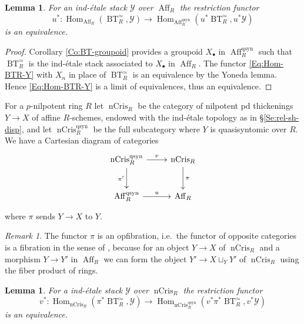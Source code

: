 \documentclass[a4paper,11pt]{amsart}
\theoremstyle{plain}
\newtheorem{Lemma}[equation]{Lemma}
\theoremstyle{definition}
\theoremstyle{remark}
\newtheorem{Remark}[equation]{Remark}
\newcommand{\bLe}{\begin{Lemma}}
\newcommand{\eLe}{\end{Lemma}}
\newcommand{\bRe}{\begin{Remark}}
\newcommand{\eRe}{\end{Remark}}
\newcommand{\bproof}{\begin{proof}}
\newcommand{\eproof}{\end{proof}}
\newcommand{\beqn}{\begin{equation}}
\newcommand{\eeqn}{\end{equation}}
\numberwithin{equation}{section}
\newcommand{\YYY}{\mathcal{Y}}
\DeclareMathOperator{\qsyn}{qsyn}
\DeclareMathOperator{\Aff}{Aff}
\DeclareMathOperator{\nCrys}{nCris}
\DeclareMathOperator{\BT}{BT}
\DeclareMathOperator{\Hom}{Hom}
\begin{document}
\bLe
\label{Le:Hom-BTR-Y}
For an ind-\'etale stack $\YYY$ over $\Aff_R$ the restriction functor 
\beqn
\label{Eq:Hom-BTR-Y}
u^*\colon \Hom_{\Aff_R}(\BT^\simeq_R,\YYY)\to\Hom_{\Aff_R^{\qsyn}}(u^*\BT^\simeq_R,u^*\YYY)
\eeqn
is an equivalence. 
\eLe

\bproof
Corollary \ref{Co:BT-groupoid} provides a groupoid $X_\bullet$ in $\Aff_R^{\qsyn}$ such that $\BT^\simeq_R$ is the ind-\'etale stack associated to $X_\bullet$ in $\Aff_R$. The functor \eqref{Eq:Hom-BTR-Y} with $X_n$ in place of $\BT^\simeq_R$ is an equivalence by the Yoneda lemma. Hence \eqref{Eq:Hom-BTR-Y} is a limit of equivalences, thus an equivalence.
\eproof

For a $p$-nilpotent ring $R$ let $\nCrys_R$ be the category of nilpotent pd thickenings $Y\to X$ of affine $R$-schemes, endowed with the ind-\'etale topology as in \S\ref{Se:rel-sh-disp}, and let $\nCrys_R^{\qsyn}$ be the full subcategory where $Y$ is quasisyntomic over $R$. We have a Cartesian diagram of categories
\[
\xymatrix@M+0.2em{
\nCrys_R^{\qsyn} \ar[r]^-v \ar[d]_{\pi'} & \nCrys_R \ar[d]^\pi \\
\Aff_R^{\qsyn} \ar[r]^-u & \Aff_R
}
\]
where $\pi$ sends $Y\to X$ to $Y$.

\bRe
\label{Re:pi-cocart}
The functor $\pi$ is an opfibration, i.e.\ the functor of opposite categories is a fibration in the sense of \cite[\href{https://stacks.math.columbia.edu/tag/02XM}{Definition 02XM}]{Stacks}, because for an object $Y\to X$ of $\nCrys_R$ and a morphism $Y\to Y'$ in $\Aff_R$ we can form the object $Y'\to X\sqcup_YY'$ of $\nCrys_R$ using the fiber product of rings.
\eRe

\bLe
\label{Le:Hom-BTR-Y-nCrys}
For a ind-\'etale stack $\YYY$ over $\nCrys_R$ the restriction functor 
\beqn
\label{Eq:Hom-BTR-Y-nCrys}
v^*\colon \Hom_{\nCrys_R}(\pi^*\BT^\simeq_R,\YYY)\to\Hom_{\nCrys_R^{\qsyn}}(v^*\pi^*\BT^\simeq_R,v^*\YYY)
\eeqn
is an equivalence. 
\eLe
\end{document}
